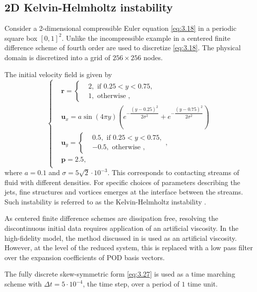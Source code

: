 \subsection{2D Kelvin-Helmholtz instability}
Consider a 2-dimensional compressible Euler equation \eqref{eq:3.18} in a periodic square box $[0,1]^2$. Unlike the incompressible example in  a centered finite difference scheme of fourth order are used to discretize \eqref{eq:3.18}. The physical domain is discretized into a grid of $256\times 256$ nodes.

The initial velocity field is given by
\begin{equation*}
\begin{cases}
& \mathbf{r} = 
\begin{cases}
& 2, \text{ if } 0.25<y<0.75,\\
& 1, \text{ otherwise },
\end{cases}
\\
& \mathbf{u}_x = a \sin(4\pi y) \left( e^{-\dfrac{(y-0.25)^2}{2\sigma^2}} + e^{-\dfrac{(y-0.75)^2}{2\sigma^2}} \right)\\
& \mathbf{u}_y = 
\begin{cases}
& 0.5, \text{ if } 0.25<y<0.75,\\
& -0.5, \text{ otherwise },
\end{cases},
\\
& \mathbf{p} = 2.5,\\
\end{cases}
\end{equation*}
where $a=0.1$ and $\sigma=5\sqrt{2}\cdot 10^{-3}$. This corresponds to contacting streams of fluid with different densities. For specific choices of parameters describing the jets, fine structures and vortices emerges at the interface between the streams. Such instability is referred to as the Kelvin-Helmholtz instability \cite{HHS}.

As centered finite difference schemes are dissipation free, resolving the discontinuous initial data requires application of an artificial viscosity. In the high-fidelity model, the method discussed in \cite{artificial_dissipation} is used as an artificial viscosity. However, at the level of the reduced system, this is replaced with a low pass filter over the expansion coefficients of POD basis vectors.

The fully discrete skew-symmetric form \eqref{eq:3.27} is used as a time marching scheme with $\Delta t = 5 \cdot 10^{-4}$, the time step, over a period of $1$ time unit.

